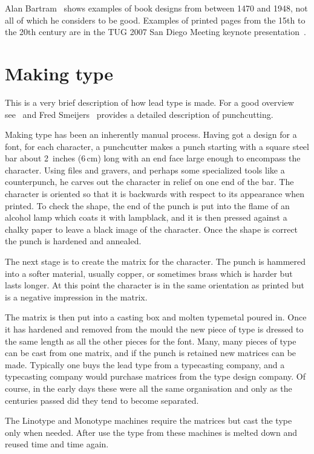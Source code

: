 \documentclass[10pt,letterpaper,extrafontsizes]{memoir}
\newcommand\U[2]{\textrm{#1}\,\textrm{#2}}
\begin{document}
    Alan Bartram~\autocite{BARTRAM01} shows examples of book designs from between
1470 and 1948, not all of which he considers to be good. Examples of printed
pages from the 15th to the 20th century are in the TUG 2007 San Diego Meeting
keynote presentation~\autocite{TUGKEYNOTE07}.


\section{Making type}

    This is a very brief description of how lead type is made. For
a good overview see~\autocite{CHAPPELL99} and Fred Smeijers~\autocite{SMEIJERS96}
provides a detailed description of punchcutting.
 
Making type has been an inherently manual process. Having got a design
for a font, for each character, a punchcutter makes a punch starting
with a square steel bar about 2~inches (\U{6}{cm}) long with
an end face large enough to encompass the character. Using files and
gravers, and perhaps some specialized tools like a counterpunch, he
carves out the character in relief on one end of the bar. The
character is oriented so that it is backwards with respect to its
appearance when printed.  To check the shape, the end of the punch is
put into the flame of an alcohol lamp which coats it with lampblack,
and it is then pressed against a chalky paper to leave a black image
of the character. Once the shape is correct the punch is hardened and
annealed.

   The next stage is to create the matrix for the character. The punch is
hammered into a softer material, usually copper, or sometimes brass which
is harder but lasts longer. At this point the character is in the same
orientation as printed but is a negative impression in the matrix.

   The matrix is then put into a casting box and molten typemetal poured in.
Once it has hardened and removed from the mould the new piece of type is 
dressed to the same length as all the other pieces for the font. Many, many 
pieces of type can be cast from one matrix, and if the punch is retained new
matrices can be made. Typically one buys the lead type from a typecasting
company, and a typecasting company would purchase matrices from the type
design company. Of course, in the early days these were all the same 
organisation and only as the centuries passed did they tend to become
separated.

   The Linotype and Monotype machines 
require the matrices but cast the type only when needed. After use the type 
from these machines is melted down and reused time and time again.
\end{document}
